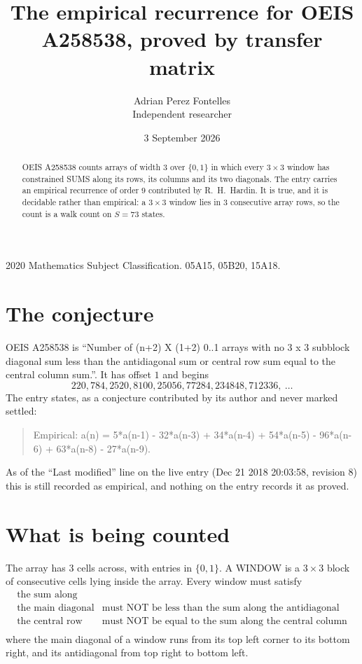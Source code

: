 \documentclass[11pt,a4paper]{article}
\title{The empirical recurrence for OEIS A258538, proved by transfer matrix}
\author{Adrian Perez Fontelles\\ \small Independent researcher}
\date{3 September 2026}
\theoremstyle{plain}
\theoremstyle{definition}
\begin{document}
\maketitle

\begin{abstract}
OEIS A258538 counts arrays of width $3$ over $\{0,1\}$ in which every $3\times3$ window has
constrained SUMS along its rows, its columns and its two diagonals. The entry carries an
empirical recurrence of order $9$ contributed by R.~H.~Hardin. It is true, and it is
decidable rather than empirical: a $3\times3$ window lies in $3$ consecutive array rows,
so the count is a walk count on $S=73$ states.
\end{abstract}

\noindent\small 2020 Mathematics Subject Classification. 05A15, 05B20, 15A18.\normalsize

\section{The conjecture}

OEIS A258538 is ``Number of (n+2) X (1+2) 0..1 arrays with no 3 x 3 subblock diagonal sum less than the antidiagonal sum or central row sum equal to the central column sum.''. It has offset $1$ and begins
\[
220, 784, 2520, 8100, 25056, 77284, 234848, 712336,\ \dots
\]
The entry states, as a conjecture contributed by its author and never marked settled:
\begin{quote}
Empirical: a(n) = 5*a(n-1) - 32*a(n-3) + 34*a(n-4) + 54*a(n-5) - 96*a(n-6) + 63*a(n-8) - 27*a(n-9).
\end{quote}
As of the ``Last modified'' line on the live entry (Dec 21 2018 20:03:58, revision 8) this is still
recorded as empirical, and nothing on the entry records it as proved.

\section{What is being counted}

The array has $3$ cells across, with entries in $\{0,1\}$. A WINDOW is a $3\times3$ block
of consecutive cells lying inside the array. Every window must satisfy
\[
\begin{array}{ll}
\text{the sum along} & \text{} \\[2pt]
\text{the main diagonal} & \text{must NOT be less than the sum along the antidiagonal} \\
\text{the central row} & \text{must NOT be equal to the sum along the central column} \\
\end{array}
\]
where the main diagonal of a window runs from its top left corner to its bottom right, and its
antidiagonal from top right to bottom left.
\end{document}
